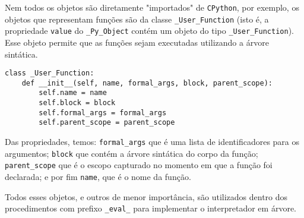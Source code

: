Nem todos os objetos são diretamente "importados" de
\texttt{CPython}, por exemplo, os objetos que representam
funções são da classe \verb|_User_Function| (isto é,
a propriedade \verb|value| do \verb|_Py_Object| contém
um objeto do tipo \verb|_User_Function|). Esse objeto
permite que as funções sejam executadas utilizando a
árvore sintática.

\begin{lstlisting}
class _User_Function:
    def __init__(self, name, formal_args, block, parent_scope):
        self.name = name
        self.block = block
        self.formal_args = formal_args
        self.parent_scope = parent_scope
\end{lstlisting}

\noindent Das propriedades, temos:
\verb|formal_args| que é uma lista de identificadores
para os argumentos; \verb|block| que contém a árvore  
sintática do corpo da função; \verb|parent_scope| que é  
o escopo capturado no momento em que a função foi declarada;
e por fim \verb|name|, que é o nome da função.

Todos esses objetos, e outros de menor importância,
são utilizados dentro dos procedimentos com prefixo
\verb|_eval_| para implementar o interpretador em árvore.